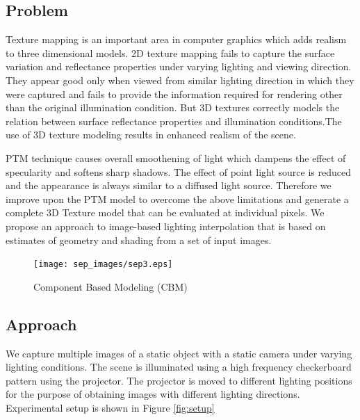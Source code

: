 \subsection{Problem}
Texture mapping is an important area in computer graphics which adds realism to three dimensional models.
2D texture mapping fails to capture the surface variation and reflectance properties under
varying lighting and viewing direction. They appear good only when viewed from similar lighting
direction in which they were captured and fails to provide the information required for rendering other than the original
illumination condition. But 3D textures correctly models the relation between surface reflectance
properties and illumination conditions.The use of 3D texture modeling
results in enhanced realism of the scene.

PTM technique causes overall smoothening of light which dampens the effect
of specularity and softens sharp shadows. The effect of point light source is
reduced and the appearance is always similar to a diffused light source.
Therefore we improve upon the PTM model 
to overcome the above limitations
and generate a complete 3D Texture model that can be evaluated at individual
pixels. We propose an approach to image-based lighting interpolation that is
based on estimates of geometry and shading from a set of input images.


\begin{figure}[t]
\centering
\texttt{[image: sep\_images/sep3.eps]}

\caption{Component Based Modeling (CBM)}
\label{fig:CBM}
\end{figure}

\subsection{Approach}
We capture multiple images of a static object with a static camera under varying
lighting conditions.
The scene is
illuminated using a high frequency checkerboard pattern using the projector. The
projector is moved to different lighting positions for the purpose of obtaining
images with different lighting directions. Experimental setup is shown in Figure \ref{fig:setup}

